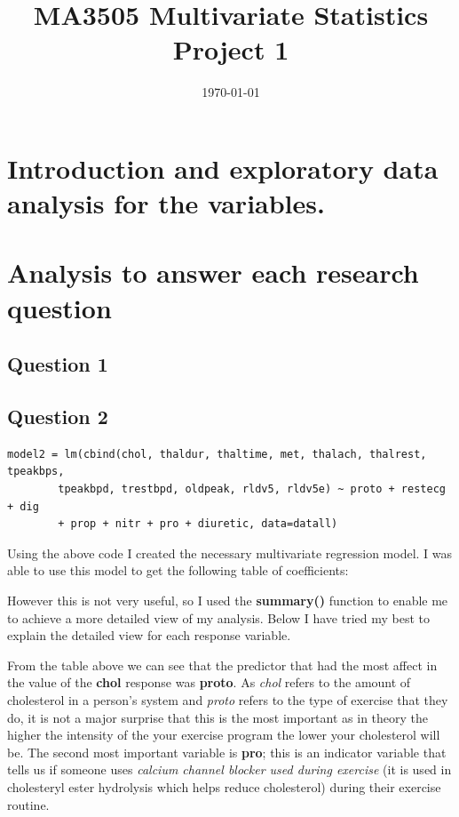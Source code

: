 \documentclass[a4paper]{article}
\title{MA3505 Multivariate Statistics Project 1}
\date{\today}
\begin{document}
\maketitle


\section{Introduction and exploratory data analysis for the variables.}


\section{Analysis to answer each research question}

\subsection{Question 1}

\newpage
\subsection{Question 2}

\begin{lstlisting}[frame=single]
model2 = lm(cbind(chol, thaldur, thaltime, met, thalach, thalrest, tpeakbps,
		tpeakbpd, trestbpd, oldpeak, rldv5, rldv5e) ~ proto + restecg + dig
		+ prop + nitr + pro + diuretic, data=datall)
\end{lstlisting}

Using the above code I created the necessary multivariate regression model.
I was able to use this model to get the following table of coefficients:

However this is not very useful, so I used the \textbf{summary()} function to
enable me to achieve a more detailed view of my analysis. Below I have tried
my best to explain the detailed view for each response variable.

\newpage

From the table above we can see that the predictor that had the most
affect in the value of the \textbf{chol} response was \textbf{proto}. As
\textit{chol} refers to the amount of cholesterol in a person's system and
\textit{proto} refers to the type of exercise that they do, it is not a major
surprise that this is the most important as in theory the higher the intensity
of the your exercise program the lower your cholesterol will be. The second most
important variable is \textbf{pro}; this is an indicator variable that tells us
if someone uses \textit{calcium channel blocker used during exercise} (it is
used in cholesteryl ester hydrolysis which helps reduce cholesterol) during
their exercise routine.
\end{document}
